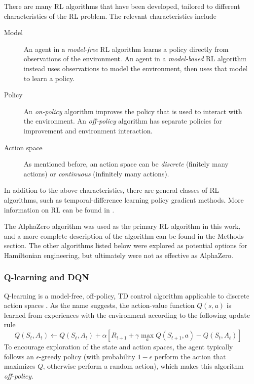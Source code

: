 There are many RL algorithms that have been developed, tailored to different characteristics of the RL problem. The relevant characteristics include
\begin{description}
    \item[Model] An agent in a \emph{model-free} RL algorithm learns a policy directly from observations of the environment. An agent in a \emph{model-based} RL algorithm instead uses observations to model the environment, then uses that model to learn a policy.
    \item[Policy] An \emph{on-policy} algorithm improves the policy that is used to interact with the environment. An \emph{off-policy} algorithm has separate policies for improvement and environment interaction.
    \item[Action space] As mentioned before, an action space can be \emph{discrete} (finitely many actions) or \emph{continuous} (infinitely many actions).
\end{description}
In addition to the above characteristics, there are general classes of RL algorithms, such as temporal-difference learning policy gradient methods. More information on RL can be found in \cite{sutton2018reinforcement}.

The AlphaZero algorithm was used as the primary RL algorithm in this work, and a more complete description of the algorithm can be found in the Methods section. The other algorithms listed below were explored as potential options for Hamiltonian engineering, but ultimately were not as effective as AlphaZero.

\subsubsection{Q-learning and DQN}

Q-learning is a model-free, off-policy, TD control algorithm applicable to discrete action spaces \cite{watkins1989learning}. As the name suggests, the action-value function $Q(s,a)$ is learned from experiences with the environment according to the following update rule
\begin{equation}\label{eq:Q_learning_update}
    Q(S_t, A_t) \leftarrow Q(S_t, A_t) +
        \alpha \left[ R_{t+1} + \gamma \max_a Q(S_{t+1}, a) - Q(S_t, A_t) \right]
\end{equation}
To encourage exploration of the state and action spaces, the agent typically follows an $\epsilon$-greedy policy (with probability $1-\epsilon$ perform the action that maximizes $Q$, otherwise perform a random action), which makes this algorithm \emph{off-policy}.

